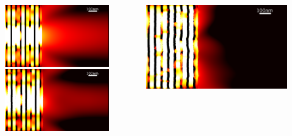 \documentclass{beamer}
\begin{document}
\begin{frame}[t]
	\begin{columns}
		\begin{column}{0.5\textwidth}
			\begin{figure}
				\includegraphics[width=\textwidth]{../images/multilayer/oer-rms0.png}\\
				\includegraphics[width=\textwidth]{../images/multilayer/oer-rms01.png}\\
			\end{figure}
		\end{column}
		\begin{column}{0.5\textwidth}
				\includegraphics[width=\textwidth]{../images/multilayer/oer-rms05.png}\\

\end{column}
\end{columns}
\end{frame}
\end{document}
